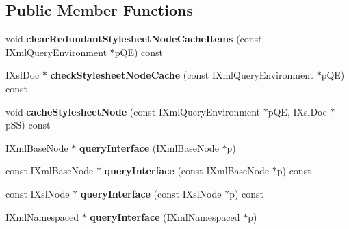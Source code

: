 \subsection*{\-Public \-Member \-Functions}
\begin{DoxyCompactItemize}
\item 
\hypertarget{classgeneral__server_1_1LibXslNode_ab07d3a2a2affb415283b5bfc91cc524c}{void {\bfseries clear\-Redundant\-Stylesheet\-Node\-Cache\-Items} (const \-I\-Xml\-Query\-Environment $\ast$p\-Q\-E) const }\label{classgeneral__server_1_1LibXslNode_ab07d3a2a2affb415283b5bfc91cc524c}

\item 
\hypertarget{classgeneral__server_1_1LibXslNode_ab011dac1b15e3eaf3c37f5bf196fea90}{\-I\-Xsl\-Doc $\ast$ {\bfseries check\-Stylesheet\-Node\-Cache} (const \-I\-Xml\-Query\-Environment $\ast$p\-Q\-E) const }\label{classgeneral__server_1_1LibXslNode_ab011dac1b15e3eaf3c37f5bf196fea90}

\item 
\hypertarget{classgeneral__server_1_1LibXslNode_a36020e93d5f2433473cb5a2d58aee03e}{void {\bfseries cache\-Stylesheet\-Node} (const \-I\-Xml\-Query\-Environment $\ast$p\-Q\-E, \-I\-Xsl\-Doc $\ast$p\-S\-S) const }\label{classgeneral__server_1_1LibXslNode_a36020e93d5f2433473cb5a2d58aee03e}

\item 
\hypertarget{classgeneral__server_1_1LibXslNode_a041ecd02ecb01c0bb5c0de1ee67a929f}{\-I\-Xml\-Base\-Node $\ast$ {\bfseries query\-Interface} (\-I\-Xml\-Base\-Node $\ast$p)}\label{classgeneral__server_1_1LibXslNode_a041ecd02ecb01c0bb5c0de1ee67a929f}

\item 
\hypertarget{classgeneral__server_1_1LibXslNode_aa5fcfc521279f3b856bd7a366ca42caa}{const \-I\-Xml\-Base\-Node $\ast$ {\bfseries query\-Interface} (const \-I\-Xml\-Base\-Node $\ast$p) const }\label{classgeneral__server_1_1LibXslNode_aa5fcfc521279f3b856bd7a366ca42caa}

\item 
\hypertarget{classgeneral__server_1_1LibXslNode_ad423ee3b4ce228b2c5f60d611a79a26b}{const \-I\-Xsl\-Node $\ast$ {\bfseries query\-Interface} (const \-I\-Xsl\-Node $\ast$p) const }\label{classgeneral__server_1_1LibXslNode_ad423ee3b4ce228b2c5f60d611a79a26b}

\item 
\hypertarget{classgeneral__server_1_1LibXslNode_a470e5be209fb866e6b6b941b2923cbbf}{\-I\-Xml\-Namespaced $\ast$ {\bfseries query\-Interface} (\-I\-Xml\-Namespaced $\ast$p)}\label{classgeneral__server_1_1LibXslNode_a470e5be209fb866e6b6b941b2923cbbf}


\end{DoxyCompactItemize}
